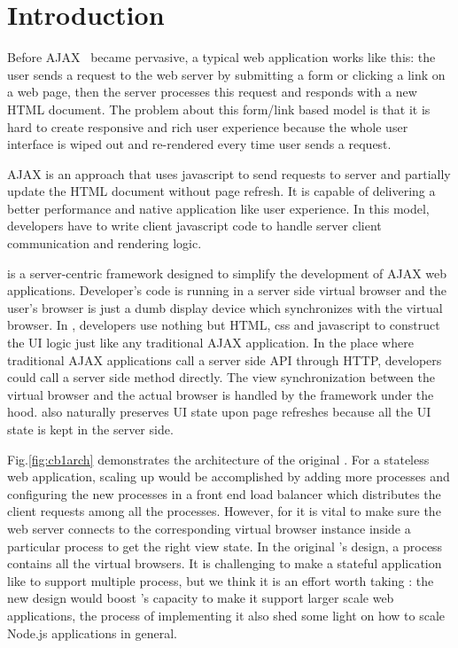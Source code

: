 \section{Introduction}
\label{sec:intro}

Before AJAX~\cite{garrett2005ajax} became pervasive, a typical web application works like this:
the user sends a request to the web server by submitting a form or clicking a link on a web page,
then the server processes this request and responds with a new HTML document.
The problem about this form/link based model is that it is hard
to create responsive and rich user experience because the whole user interface
is wiped out and re-rendered every time user sends a request.

AJAX is an approach that uses javascript to send requests to server
and partially update the HTML document without page refresh.
It is capable of delivering a better performance and native application like user experience.
In this model, developers have to write client javascript code to handle server client communication
and rendering logic.


\cb{} is a server-centric framework designed to simplify the development of AJAX web applications.
Developer's code is running in a server side virtual browser and the user's browser is just
a dumb display device which synchronizes with the virtual browser.
In \cb{}, developers use nothing but HTML, css and javascript to construct the UI logic just like
any traditional AJAX application.
In the place where traditional AJAX applications call a server side API through HTTP,
developers could call a server side method directly.
The view synchronization between the virtual browser and the actual browser is 
handled by the framework under the hood.
\cb{} also naturally preserves UI state upon page refreshes
because all the UI state is kept in the server side.




Fig.\ref{fig:cb1arch} demonstrates the architecture of the original \cb{}.
For a stateless web application,
scaling up would be accomplished by adding more processes and configuring the new processes
in a front end load balancer which distributes the client requests among all the processes.
However, for \cb{} it is vital to make sure the web server connects to the corresponding
virtual browser instance inside a particular process to get the right view state.
In the original \cb{}'s design, a \cb{} process contains all the virtual browsers.%
It is challenging to make a stateful application like \cb{} to support multiple process, 
but we think it is an effort worth taking :
the new design would boost \cb{}'s capacity to make it support larger scale web applications,
the process of implementing it also shed some light on how to scale Node.js applications in general.


